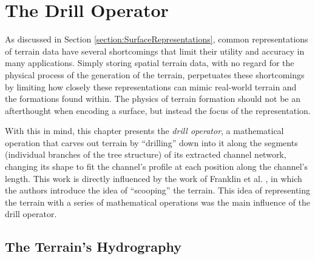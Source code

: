 \chapter{The Drill Operator}
\label{chapter:DrillOperator} 

As discussed in Section \ref{section:SurfaceRepresentations}, common representations of terrain data have several shortcomings that limit their utility and accuracy in many applications. Simply storing spatial terrain data, with no regard for the physical process of the generation of the terrain, perpetuates these shortcomings by limiting how closely these representations can mimic real-world terrain and the formations found within. The physics of terrain formation should not be an afterthought when encoding a surface, but instead the focus of the representation.

With this in mind, this chapter presents the \emph{drill operator}, a mathematical operation that carves out terrain by ``drilling'' down into it along the segments (individual branches of the tree structure) of its extracted channel network, changing its shape to fit the channel's profile at each position along the channel's length. 
This work is directly influenced by the work of Franklin et al. \cite{wrf-autocarto-2006}, in which the authors introduce the idea of ``scooping'' the terrain. This idea of representing the terrain with a series of mathematical operations was the main influence of the drill operator.

\section{The Terrain's Hydrography}
\label{section:ChannelNetworkExtraction}

